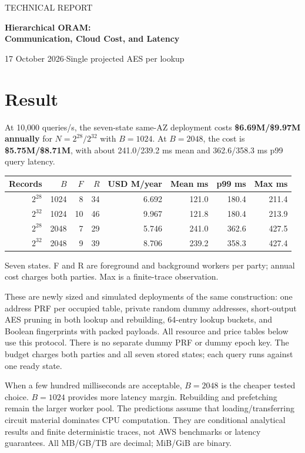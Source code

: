 \documentclass[11pt]{article}
\begin{document}
{\color{teal}\large TECHNICAL REPORT\par}
{\color{navy}\LARGE\bfseries Hierarchical ORAM:\\Communication, Cloud Cost, and Latency\par}
17 October 2026\quad$\cdot$\quad Single projected AES per lookup

\section*{Result}
At 10,000 queries/s, the seven-state same-AZ deployment costs \textbf{\$6.69M/\$9.97M annually} for $N=2^{28}/2^{32}$ with $B=1024$. At $B=2048$, the cost is \textbf{\$5.75M/\$8.71M}, with about 241.0/239.2 ms mean and 362.6/358.3 ms p99 query latency.

\begin{center}\footnotesize
\begin{tabular}{rrrrrrrr}\toprule
Records & $B$ & $F$ & $R$ & USD M/year & Mean ms & p99 ms & Max ms\\\midrule
$2^{28}$ & 1024 & 8 & 34 & 6.692 & 121.0 & 180.4 & 211.4\\
$2^{32}$ & 1024 & 10 & 46 & 9.967 & 121.8 & 180.4 & 213.9\\
$2^{28}$ & 2048 & 7 & 29 & 5.746 & 241.0 & 362.6 & 427.5\\
$2^{32}$ & 2048 & 9 & 39 & 8.706 & 239.2 & 358.3 & 427.4\\
\bottomrule\end{tabular}\end{center}
{\footnotesize Seven states. F and R are foreground and background workers per party; annual cost charges both parties. Max is a finite-trace observation.\par}

These are newly sized and simulated deployments of the same construction:
one address PRF per occupied table, private random dummy addresses,
short-output AES pruning in both lookup and rebuilding, 64-entry lookup
buckets, and Boolean fingerprints with packed payloads. All resource and
price tables below use this protocol. There is no separate dummy PRF or
dummy epoch key. The budget charges both parties and all seven stored
states; each query runs against one ready state.

When a few hundred milliseconds are acceptable, $B=2048$ is the cheaper
tested choice. $B=1024$ provides more latency margin. Rebuilding and
prefetching remain the larger worker pool. The predictions assume that
loading/transferring circuit material dominates CPU computation. They are
conditional analytical results and finite deterministic traces, not AWS
benchmarks or latency guarantees. All MB/GB/TB are decimal; MiB/GiB are binary.
\end{document}
